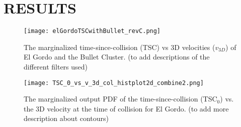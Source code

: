 
\section{RESULTS} 
\begin{figure} 
	\texttt{[image: elGordoTSCwithBullet\_revC.png]}
	\caption{The marginalized time-since-collision (TSC) vs 3D
velocities ($v_{3D}$) of El Gordo and the Bullet Cluster. (to add
descriptions of the different filters used) }
\end{figure}

\begin{figure}
	\texttt{[image: TSC\_0\_vs\_v\_3d\_col\_histplot2d\_combine2.png]}
	\caption{The marginalized output PDF of the time-since-collision
(TSC$_0$) vs. the 3D velocity at the time of collision for El Gordo. (to
add more description about contours) }
	\label{fig:TSC_v3D}
\end{figure}

